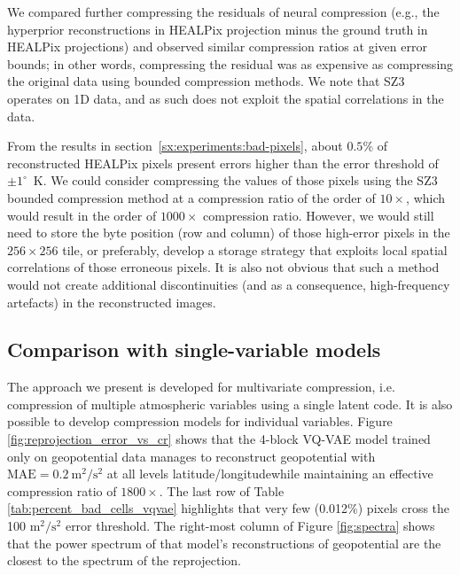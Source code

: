 We compared further compressing the residuals of neural compression (e.g., the hyperprior reconstructions in HEALPix projection minus the ground truth in HEALPix projections) and observed similar compression ratios at given error bounds; in other words, compressing the residual was as expensive as compressing the original data using bounded compression methods. We note that SZ3 operates on 1D data, and as such does not exploit the spatial correlations in the data.

From the results in section~\ref{sx:experiments:bad-pixels}, about $0.5\%$ of reconstructed HEALPix pixels present errors higher than the error threshold of $\pm 1^\circ$~K. We could consider compressing the values of those pixels using the SZ3 bounded compression method at a compression ratio of the order of $10\times$, which would result in the order of $1000\times$ compression ratio. However, we would still need to store the byte position (row and column) of those high-error pixels in the $256 \times 256$ tile, or preferably, develop a storage strategy that exploits local spatial correlations of those erroneous pixels. It is also not obvious that such a method would not create additional discontinuities (and as a consequence, high-frequency artefacts) in the reconstructed images. 

\subsection{Comparison with single-variable models}
\label{sx:discuss:geopotential}

The approach we present is developed for multivariate compression, i.e. compression of multiple atmospheric variables using a single latent code.
It is also possible to develop compression models for individual variables.
Figure \ref{fig:reprojection_error_vs_cr} shows that the 4-block VQ-VAE model trained only on geopotential data manages to reconstruct geopotential with $\text{MAE} = 0.2~\text{m}^2/\text{s}^2$ at all levels latitude/longitudewhile maintaining an effective compression ratio of $1800\times$. The last row of Table \ref{tab:percent_bad_cells_vqvae} highlights that very few (0.012\%) pixels cross the 100 $\text{m}^2/\text{s}^2$ error threshold. The right-most column of Figure \ref{fig:spectra} shows that the power spectrum of that model's reconstructions of geopotential are the closest to the spectrum of the reprojection.



